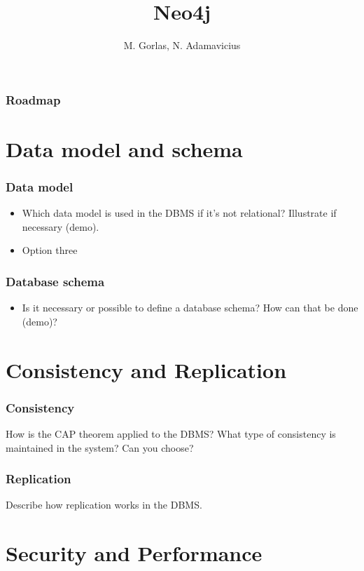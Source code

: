 \documentclass[aspectratio=169]{beamer}
\title{Neo4j}
\institute{FHTenL}
\author{M. Gorlas, N. Adamavicius}
\begin{document}
\begin{titleframe}
    \titlepage
\end{titleframe}

\begin{frame}
    \frametitle{Roadmap}
    \tableofcontents
\end{frame}

\section{Data model and schema}
\begin{frame}
    \frametitle{Data model}

    \begin{itemize}
        \item Which data model is used in the DBMS if it’s not relational? Illustrate if necessary (demo).
        \item Option three
    \end{itemize}

\end{frame}

\begin{frame}
    \frametitle{Database schema}

    \begin{itemize}
        \item Is it necessary or possible to define a database schema? How can that be done (demo)?
    \end{itemize}
\end{frame}

\section{Consistency and Replication}
\begin{frame}
    \frametitle{Consistency}
    
    How is the CAP theorem applied to the DBMS? What type of consistency
is maintained in the system? Can you choose?

\end{frame}

\begin{frame}
    \frametitle{Replication}

    Describe how replication works in the DBMS.
\end{frame}

\section{Security and Performance}
\end{document}
